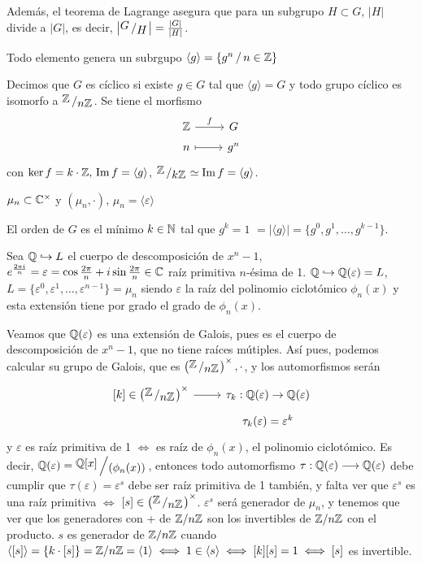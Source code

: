 Adem\'as, el teorema de Lagrange asegura que para un subgrupo $H \subset G$, $|H|$ divide a $|G|$, es decir, $\left|\modulo{G}{H} \right| = \frac{|G|}{|H|}$. 

Todo elemento genera un subrgupo $\langle g\rangle =\{g^n \, / \, n \in \mathbb{Z} \}$

Decimos que $G$ es c\'iclico si existe $g\in G$ tal que $\langle g\rangle = G$ y todo grupo c\'iclico es isomorfo a $\modulo{\bb Z}{n \bb Z}$. Se tiene el morfismo
$$\bt \bb Z \rar{f} & G \\[-5mm] n \rarmaps & g^n \et$$
con $\ker f = k \cdot \mathbb{Z}, \, \Im f = \langle g\rangle$, $\modulo{\bb Z}{k \bb Z} \simeq \Im f = \langle g \rangle$.

\begin{ejem}
    $\mu_n \subset \mathbb{C}^{\times}$ y $(\mu_n, \cdot), \, \mu_n = \langle \varepsilon \rangle$
\end{ejem}

El orden de $G$ es el m\'inimo $k \in \mathbb{N}$ tal que $g^k=1$ $= |\langle g \rangle|= \{g^0, g^1, \ldots, g^{k-1}\}$. 

Sea $\mathbb{Q} \hookrightarrow L$ el cuerpo de descomposici\'on de $x^n-1$, $e^{\frac{2\pi i}{n}} = \varepsilon = \cos \frac{2\pi}{n} + i \sin\frac{2\pi}{n} \in \mathbb{C}$ ra\'iz primitiva $n$-\'esima de 1. $\mathbb{Q} \hookrightarrow \mathbb{Q}(\varepsilon) = L$, $L = \{\varepsilon^0, \varepsilon^1, \ldots, \varepsilon^{n-1}\} = \mu_n$ siendo $\varepsilon$ la ra\'iz del polinomio ciclot\'omico $\phi_n(x)$ y esta extensi\'on tiene por grado el grado de $\phi_n(x)$. 

Veamos que $\mathbb{Q}(\varepsilon)$ es una extensi\'on de Galois, pues es el cuerpo de descomposici\'on de $x^n-1$, que no tiene ra\'ices m\'utiples. As\'i pues, podemos calcular su grupo de Galois, que es $\left(\modulo{\bb Z}{n \bb Z}\right)^{\times}, \cdot$, y los automorfismos ser\'an 
$$ \bt {[k]} \in \left(\modulo{\bb Z}{n \bb Z}\right)^{\times} \rar & \tau_k : \bb Q (\varepsilon) \to \bb Q (\varepsilon) \\[-5mm] & \tau_k(\varepsilon) = \varepsilon^k \et$$ 
y $\varepsilon$ es ra\'iz primitiva de 1 $\iff$ es ra\'iz de $\phi_n(x)$, el polinomio ciclot\'omico. Es decir, $\bb Q(\varepsilon) = \modulo{\bb Q[x]}{(\phi_n(x))}$, entonces todo automorfismo 
$\tau: \mathbb{Q}(\varepsilon)  \longrightarrow  \mathbb{Q}(\varepsilon) $
debe cumplir que $\tau(\varepsilon)  =\varepsilon^s$ debe ser ra\'iz primitiva de 1 tambi\'en, y falta ver que $\varepsilon^s$ es una ra\'iz primitiva $\iff$ $[s]\in \left(\modulo{\bb Z}{n \bb Z}\right)^{\times}$. $\varepsilon^s$ ser\'a generador de $\mu_n$, y tenemos que ver que los generadores con + de $\mathbb{Z} / n \mathbb{Z}$ son los invertibles de $\mathbb{Z} / n \mathbb{Z}$ con el producto. $s$ es generador de $\mathbb{Z} / n \mathbb{Z}$ cuando $\langle [s] \rangle = \{ k \cdot [s]\} = \mathbb{Z} / n \mathbb{Z} = \langle 1 \rangle \iff 1 \in \langle s \rangle \iff [k][s]=1 \iff [s]$ es invertible. 

